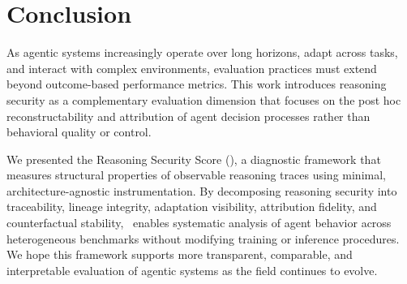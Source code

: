 \section{Conclusion}
As agentic systems increasingly operate over long horizons, adapt across tasks, and interact with complex environments, evaluation practices must extend beyond outcome-based performance metrics. This work introduces reasoning security as a complementary evaluation dimension that focuses on the post hoc reconstructability and attribution of agent decision processes rather than behavioral quality or control.

We presented the Reasoning Security Score (\RSS), a diagnostic framework that measures structural properties of observable reasoning traces using minimal, architecture-agnostic instrumentation. By decomposing reasoning security into traceability, lineage integrity, adaptation visibility, attribution fidelity, and counterfactual stability, \RSS\ enables systematic analysis of agent behavior across heterogeneous benchmarks without modifying training or inference procedures. We hope this framework supports more transparent, comparable, and interpretable evaluation of agentic systems as the field continues to evolve.

